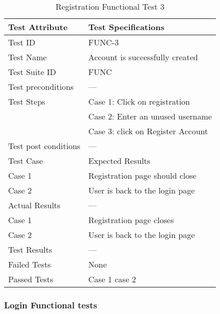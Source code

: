 \documentclass{article}
\begin{document}
\begin{table}[htbp]
\begin{center}
\begin{tabular}{|l | l|}
\hline
Test Attribute & Test Specifications \\
\hline
Test ID & FUNC-3 \\
\hline
Test Name  & Account is successfully created \\
\hline
Test Suite  ID & FUNC \\
\hline
Test preconditions & --- \\
\hline
Test Steps & Case 1: Click on registration \\
\hline
  & Case 2: Enter an unused username  \\
\hline
  & Case 3: click on Register Account \\
\hline
Test post conditions & --- \\
\hline
Test Case & Expected Results\\
\hline
Case 1  &  Registration page should close\\
\hline
Case 2 &  User is back to the login page  \\
\hline
Actual Results & ---\\
\hline
Case 1  &  Registration page closes\\
\hline
Case 2 &  User is back to the login page  \\
\hline
Test Results & ---\\
\hline
Failed Tests & None\\
\hline
Passed Tests & Case 1 case 2\\
\hline
\end{tabular}
\end{center}
\caption{Registration Functional Test 3}
\end{table}
\label{table:2c}


\newpage

\subsubsection{Login Functional tests}
\end{document}
